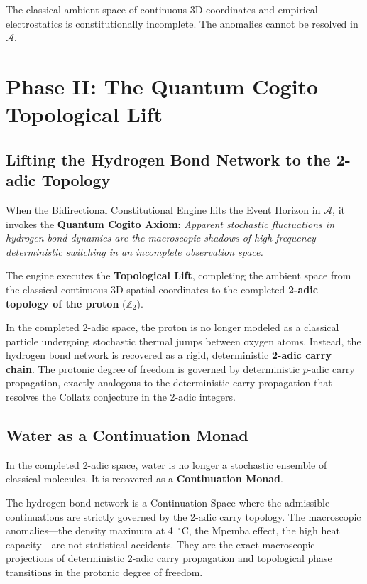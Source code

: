 \documentclass[11pt,openany]{extbook}
\theoremstyle{plain}
\theoremstyle{definition}
\begin{document}
The classical ambient space of continuous 3D coordinates and empirical electrostatics is constitutionally incomplete. The anomalies cannot be resolved in $\mathcal{A}$.

\section{Phase II: The Quantum Cogito Topological Lift}

\subsection{Lifting the Hydrogen Bond Network to the 2-adic Topology}
When the Bidirectional Constitutional Engine hits the Event Horizon in $\mathcal{A}$, it invokes the \textbf{Quantum Cogito Axiom}: \textit{Apparent stochastic fluctuations in hydrogen bond dynamics are the macroscopic shadows of high-frequency deterministic switching in an incomplete observation space.}

The engine executes the \textbf{Topological Lift}, completing the ambient space from the classical continuous 3D spatial coordinates to the completed \textbf{2-adic topology of the proton} ($\mathbb{Z}_2$).

In the completed 2-adic space, the proton is no longer modeled as a classical particle undergoing stochastic thermal jumps between oxygen atoms. Instead, the hydrogen bond network is recovered as a rigid, deterministic \textbf{2-adic carry chain}. The protonic degree of freedom is governed by deterministic $p$-adic carry propagation, exactly analogous to the deterministic carry propagation that resolves the Collatz conjecture in the 2-adic integers.

\subsection{Water as a Continuation Monad}
In the completed 2-adic space, water is no longer a stochastic ensemble of classical molecules. It is recovered as a \textbf{Continuation Monad}.

The hydrogen bond network is a Continuation Space where the admissible continuations are strictly governed by the 2-adic carry topology. The macroscopic anomalies---the density maximum at 4~$^\circ$C, the Mpemba effect, the high heat capacity---are not statistical accidents. They are the exact macroscopic projections of deterministic 2-adic carry propagation and topological phase transitions in the protonic degree of freedom.
\end{document}
